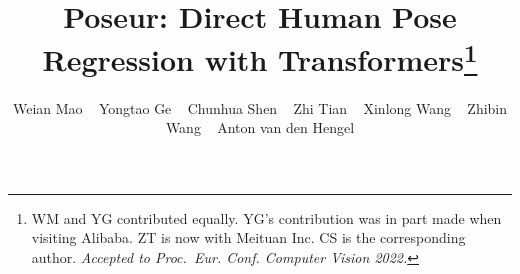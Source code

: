 \documentclass[runningheads]{llncs}
\begin{document}
\pagestyle{headings}
\mainmatter
\def\ECCVSubNumber{4552}  

\title{Poseur: Direct Human Pose Regression with Transformers\thanks{WM and YG contributed equally.
YG's contribution was in part made when visiting Alibaba.
ZT is now with Meituan Inc.
CS is the corresponding author.
\it 
Accepted to Proc.\ Eur. Conf. Computer Vision 2022.
}} 

\author{Weian Mao\textsuperscript{}
        ~ Yongtao Ge\textsuperscript{}
        ~ Chunhua Shen\textsuperscript{} 
        ~ Zhi Tian\textsuperscript{} 
        ~ Xinlong Wang\textsuperscript{} 
        ~ Zhibin Wang\textsuperscript{} 
        ~ Anton van den Hengel\textsuperscript{} }



\begin{comment}
\titlerunning{Abbreviated paper title}
\author{First Author\inst{1}\orcidID{0000-1111-2222-3333} \and
Second Author\inst{2,3}\orcidID{1111-2222-3333-4444} \and
Third Author\inst{3}\orcidID{2222--3333-4444-5555}}
\authorrunning{F. Author et al.}
\institute{Princeton University, Princeton NJ 08544, USA \and
Springer Heidelberg, Tiergartenstr. 17, 69121 Heidelberg, Germany
\email{lncs@springer.com}\\
\url{http://www.springer.com/gp/computer-science/lncs} \and
ABC Institute, Rupert-Karls-University Heidelberg, Heidelberg, Germany\\
\email{\{abc,lncs\}@uni-heidelberg.de}}
\end{comment}
\maketitle
\end{document}
